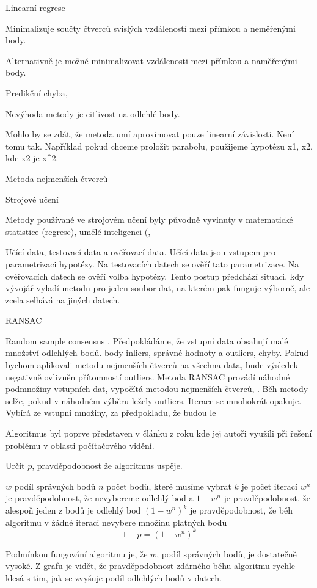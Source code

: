 \documentclass[
  color, %
  table, %
  lof,   %
  lot,   %
]{fithesis3}
\begin{document}
Linearní regrese

Minimalizuje součty čtverců svislých vzdáleností mezi přímkou a neměřenými body.

Alternativně je možné minimalizovat vzdálenosti mezi přímkou a naměřenými body.

Predikční chyba,

Nevýhoda metody je citlivost na odlehlé body.

Mohlo by se zdát, že metoda umí aproximovat pouze linearní závislosti. Není tomu tak. Například pokud chceme proložit parabolu, použijeme hypotézu x1, x2, kde x2 je x^2.

Metoda nejmenších čtverců

Strojové učení

Metody používané ve strojovém učení byly původně vyvinuty v matematické statistice (regrese), umělé inteligenci (, 

Učící data, testovací data a ověřovací data.
Učící data jsou vstupem pro parametrizaci hypotézy. Na testovacích datech se ověří tato parametrizace. Na ověřovacích datech se ověří volba hypotézy. Tento postup předchází situaci, kdy vývojář vyladí metodu pro jeden soubor dat, na kterém pak funguje výborně, ale zcela selhává na jiných datech.

RANSAC

Random sample consensus . Předpokládáme, že vstupní data obsahují malé množství odlehlých bodů. body inliers, správné hodnoty a outliers, chyby. Pokud bychom aplikovali metodu nejmenších čtverců na všechna data, bude výsledek negativně ovlivněn přítomností outliers. Metoda RANSAC provádí náhodné podmnožiny vstupních dat, vypočítá metodou nejmenších čtverců, . Běh metody selže, pokud v náhodném výběru ležely outliers. Iterace se mnohokrát opakuje. Vybírá ze vstupní množiny, za předpokladu, že budou le

Algoritmus byl poprve představen v článku z roku kde jej autoři využili při řešení problému v oblasti počítačového vidění.

Určit $p$, pravděpodobnost že algoritmus uspěje.

$w$ podíl správných bodů
$n$ počet bodů, které musíme vybrat
$k$ je počet iterací
$w^n$ je pravděpodobnost, že nevybereme odlehlý bod a $1-w^n$ je pravděpodobnost, že alespoň jeden z bodů je odlehlý bod
$(1-w^n)^k$ je pravděpodobnost, že běh algoritmu v žádné iteraci nevybere množinu platných bodů
\[1-p=(1-w^n)^k\]

Podmínkou fungování algoritmu je, že $w$, podíl správných bodů, je dostatečně vysoké. Z grafu je vidět, že pravděpodobnost zdárného běhu algoritmu rychle klesá s tím, jak se zvyšuje podíl odlehlých bodů v datech.
\end{document}
